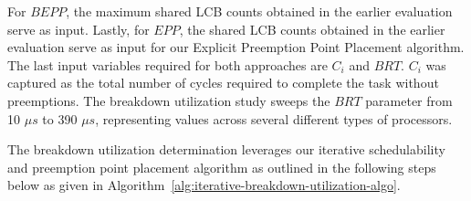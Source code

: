 For ${BEPP}$, the maximum shared LCB counts obtained in the earlier evaluation serve as input. Lastly, for ${EPP}$, the shared LCB counts obtained in the earlier evaluation serve as input for our Explicit Preemption Point Placement algorithm.  The last input variables required for both approaches are ${C_i}$ and ${BRT}$. ${C_i}$ was captured as the total number of cycles required to complete the task without preemptions. The breakdown utilization study sweeps the ${BRT}$ parameter from 10 ${{\mu}s}$ to 390 ${{\mu}s}$, representing values across several different types of processors.

The breakdown utilization determination leverages our iterative schedulability and preemption point placement algorithm as outlined in the following steps below as given in Algorithm~\ref{alg:iterative-breakdown-utilization-algo}.
